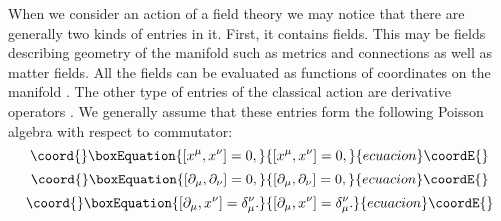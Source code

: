 \documentclass[a4paper,11pt]{article}
\begin{document}
When we consider an action of a field theory we may notice that
there are generally two kinds of entries in it. First, it contains
fields. This may be fields describing geometry of the manifold
such as metrics and connections as well as  matter fields. All the
fields can be evaluated as functions of coordinates on the
manifold \coordHE{}. The other type of entries of the classical
action are derivative operators \myHighlight{$\partial_\mu$}\coordHE{}. We generally
assume that these entries form the following Poisson algebra with
respect to commutator:
\begin{equation}\coord{}\boxEquation{
[x^\mu,x^\nu]=0, \label{pa1}
}{
[x^\mu,x^\nu]=0, }{ecuacion}\coordE{}\end{equation}
\begin{equation}\coord{}\boxEquation{
[\partial_\mu,\partial_\nu]=0, \label{pa2}
}{
[\partial_\mu,\partial_\nu]=0, }{ecuacion}\coordE{}\end{equation}
\begin{equation}\coord{}\boxEquation{
[\partial_\mu,x^\nu]=\delta_\mu^\nu. \label{pa3}
}{
[\partial_\mu,x^\nu]=\delta_\mu^\nu. }{ecuacion}\coordE{}\end{equation}
\end{document}
